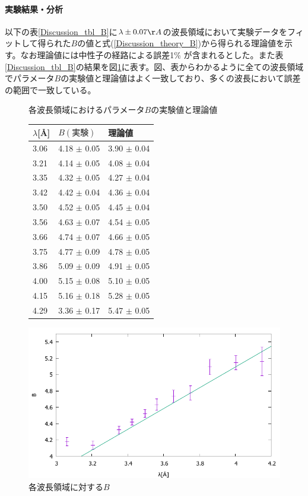\paragraph{実験結果・分析}
以下の表\ref{Discussion_tbl_B}に$\lambda \pm 0.07 \AA$の波長領域において実験データをフィットして得られた$B$の値と式(\ref{Discussion_theory_B})から得られる理論値を示す。なお理論値には中性子の経路による誤差1\% が含まれるとした。また表\ref{Discussion_tbl_B}の結果を図\ref{Discussion_fig_B}に表す。図、表からわかるように全ての波長領域でパラメータ$B$の実験値と理論値はよく一致しており、多くの波長において誤差の範囲で一致している。

\begin{figure}[h]
\begin{minipage}{0.35\hsize}
\centering
\makeatletter
\def\@captype{table}
\makeatother
\caption{各波長領域におけるパラメータ$B$の実験値と理論値} \label{Discussion_tbl_B}
\begin{tabular}{|l|ll|}\hline
$\lambda$[\AA] &  $B(実験)$ &   理論値 \\ \hline
3.06  & 4.18  $\pm$ 0.05  & 3.90  $\pm$ 0.04  \\
3.21  & 4.14  $\pm$ 0.05  & 4.08  $\pm$ 0.04  \\
3.35  & 4.32  $\pm$ 0.05  & 4.27  $\pm$ 0.04  \\
3.42  & 4.42  $\pm$ 0.04  & 4.36  $\pm$ 0.04  \\
3.50  & 4.52  $\pm$ 0.05  & 4.45  $\pm$ 0.04  \\
3.56  & 4.63  $\pm$ 0.07  & 4.54  $\pm$ 0.05  \\
3.66  & 4.74  $\pm$ 0.07  & 4.66  $\pm$ 0.05  \\
3.75  & 4.77  $\pm$ 0.09  & 4.78  $\pm$ 0.05  \\
3.86  & 5.09  $\pm$ 0.09  & 4.91  $\pm$ 0.05  \\
4.00  & 5.15  $\pm$ 0.08  & 5.10  $\pm$ 0.05  \\
4.15  & 5.16  $\pm$ 0.18  & 5.28  $\pm$ 0.05  \\
4.29  & 3.36  $\pm$ 0.17  & 5.47  $\pm$ 0.05  \\ \hline
\end{tabular}
\end{minipage}
\begin{minipage}{0.65\hsize}
\centering
\includegraphics[width=\hsize]{discussion/B/B_F.pdf}
\caption{各波長領域に対する$B$} \label{Discussion_fig_B}
\end{minipage}
\end{figure}

